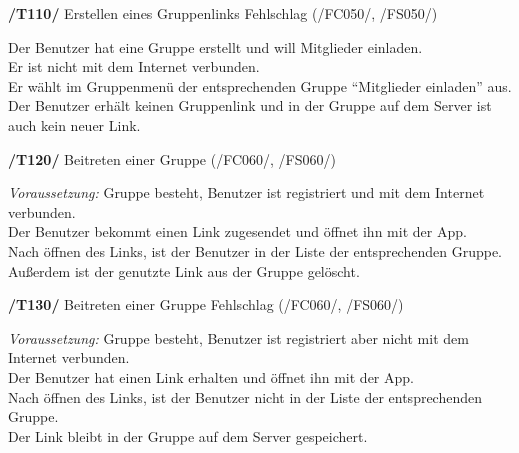 \textbf{/T110/} Erstellen eines Gruppenlinks Fehlschlag (/FC050/, /FS050/)\\
\begin{center}
\vspace{-\parskip}
\begin{minipage}[t]{0.9\textwidth}
Der Benutzer hat eine Gruppe erstellt und will Mitglieder einladen.            \\
Er ist nicht mit dem Internet verbunden.                                        \\
Er wählt im Gruppenmenü der entsprechenden Gruppe "`Mitglieder einladen"' aus.     \\
Der Benutzer erhält keinen Gruppenlink und in der Gruppe auf dem Server ist auch kein neuer Link.\\
\end{minipage}
\end{center}

\textbf{/T120/} Beitreten einer Gruppe (/FC060/, /FS060/)\\
\begin{center}
\vspace{-\parskip}
\begin{minipage}[t]{0.9\textwidth}
\emph{Voraussetzung:} Gruppe besteht, Benutzer ist registriert und mit dem Internet verbunden. \\
Der Benutzer bekommt einen Link zugesendet und öffnet ihn mit der App.                   \\
Nach öffnen des Links, ist der Benutzer in der Liste der entsprechenden Gruppe.           \\
Außerdem ist der genutzte Link aus der Gruppe gelöscht.                                    \\
\end{minipage}
\end{center}

\textbf{/T130/} Beitreten einer Gruppe Fehlschlag (/FC060/, /FS060/)\\
\begin{center}
\vspace{-\parskip}
\begin{minipage}[t]{0.9\textwidth}
\emph{Voraussetzung:} Gruppe besteht, Benutzer ist registriert aber nicht mit dem Internet verbunden.\\
Der Benutzer hat einen Link erhalten und öffnet ihn mit der App.                               \\
Nach öffnen des Links, ist der Benutzer nicht in der Liste der entsprechenden Gruppe.           \\
Der Link bleibt in der Gruppe auf dem Server gespeichert.                                        \\
\end{minipage}
\end{center}

